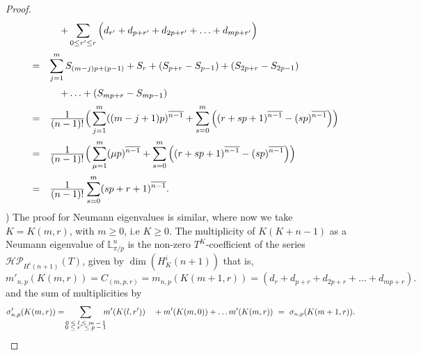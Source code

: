 \documentclass[11pt,a4paper,times]{amsart}
\theoremstyle{plain}
\theoremstyle{definition}
\numberwithin{equation}{section}
\newcommand{\ds}{\displaystyle}
\newcommand{\dsum}{\ds\sum}
\newcommand{\eqskip}{ \vspace*{2mm}\\ }
\newcommand{\fr}[2]{\frac{\ds #1}{\ds #2}}
\newcommand{\lune}[2]{\mathbb{L}^{#1}_{#2}}
\begin{document}
{\begin{proof}
\[\begin{array}{lll}
&& \hspace*{4mm} + \dsum_{0\leq r'\leq r} \Big{(}d_{r'}+ d_{p+r'}+ d_{2p+r'}+\ldots+d_{mp+r'}\Big{)}\eqskip
& = & \dsum_{j=1}^m  S_{(m-j)p+(p-1)}
+S_r + (S_{p+r}-S_{p-1}) +(S_{2p+r}-S_{2p-1})\eqskip
& & \hspace*{4mm} + \ldots + (S_{mp+r}-S_{mp-1})\eqskip
& = & \fr{1}{(n-1)!}\Big{(}\dsum_{j=1}^m  ((m-j+1)p)^{\overline{n-1}}+ \dsum_{s=0}^m\Big{(}(r+sp+1)^{\overline{n-1}}-(sp)^{\overline{n-1}}\Big{)} \Big{)}\eqskip
& = &\fr{1}{(n-1)!}\Big{(}\dsum_{\mu=1}^m  (\mu p)^{\overline{n-1}}+ \dsum_{s=0}^m\Big{(}(r+sp +1)^{\overline{n-1}}-(sp)^{\overline{n-1}}\Big{)} \Big{)}\eqskip
& = &  \fr{1}{(n-1)!}\dsum_{s=0}^m(sp+r+1)^{\overline{n-1}}.
\end{array}
\]
) The proof for Neumann eigenvalues is similar, where now we take $K=K(m,r)$, with $m\geq 0$, i.e $K\geq 0$. The multiplicity of $K(K+n-1)$ as a Neumann eigenvalue of $\lune{n}{\pi/p}$ is the  non-zero $T^K$-coefficient of  the  series $\mathcal{HP}_{H^i(n+1)}(T)$, given by $\dim(H^i_K(n+1))$ that is,
\[m'_{n,p}(K(m,r))= C_{(m,p,r)}= m_{n,p}(K(m+1,r))=
(d_r+ d_{p+r}+ d_{2p+r}+\ldots+d_{mp+r}).\]
and the sum of multiplicities by
\begin{gather*}
\sigma'_{n,p}(K(m,r)) =
\!\!\!\! \dsum_{\scriptsize
\begin{array}{c}
0\leq l\leq m-1\\[-1mm] 0\leq r'\leq p-1\end{array}} \!\!\!\!\!\!m'(K(l,r'))~~~ + m'(K(m,0))+\ldots m'(K(m,r))~=~\sigma_{n,p}(K(m+1,r)).
\end{gather*}
\end{proof}


}
\end{document}

